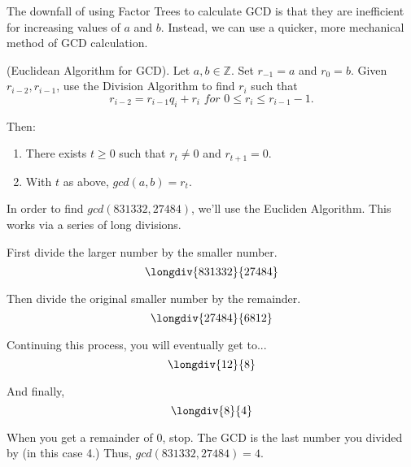 The downfall of using Factor Trees to calculate GCD is that they are inefficient for increasing values of $a$ and $b$. Instead, we can use a quicker, more mechanical method of GCD calculation.


\begin{theorem}
(Euclidean Algorithm for GCD). 
Let $a, b \in \mathbb{Z}$. 
Set $r_{-1} = a$ and $r_{0} = b$. 
Given $r_{i-2}, r_{i-1}$, use the Division Algorithm to find $r_{i}$ such that 
\[r_{i-2} = r_{i-1}q_{i} + r_{i}\,\,for\,\,0 \leq r_{i} \leq r_{i-1} - 1.\]

Then:
\begin{enumerate}
    \item  There exists $t \geq 0$ such that $r_{t} \neq 0  $ and $  r_{t+1} = 0.$
    \item  With $t$ as above, $gcd(a, b) = r_{t}.$
\end{enumerate}
\end{theorem}

\begin{example} In order to find $gcd(831332,27484)$, we'll use the Eucliden Algorithm.  This works via a series of long divisions.

First divide the larger number by the smaller number.
\[
\longdiv{831332}{27484}
\]

 Then divide the original smaller number by the remainder.
\[
\longdiv{27484}{6812}
\]

 Continuing this process, you will eventually get to...
\[
\longdiv{12}{8}
\]
 
 And finally,
\[
\longdiv{8}{4}
\]
 
When you get a remainder of 0, stop. The GCD is the last number you divided by (in this case 4.) 
Thus, $gcd(831332,27484)= 4$.
\end{example}